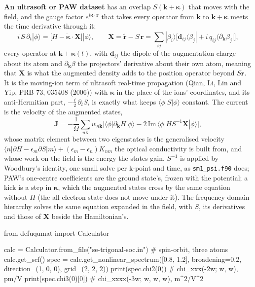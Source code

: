 \documentclass[11pt,a4paper]{article}
\newcommand{\code}[1]{\texttt{\small #1}}
\begin{document}
\textbf{An ultrasoft or PAW dataset} has an overlap $S(\mathbf k+\boldsymbol\kappa)$
that moves with the field, and the gauge factor $e^{i\boldsymbol\kappa\cdot\mathbf r}$
that takes every operator from $\mathbf k$ to $\mathbf k+\boldsymbol\kappa$ meets
the time derivative through it:
\begin{equation*}
i\,S\,\partial_t|\phi\rangle = \big[H - \dot{\boldsymbol\kappa}\cdot\mathbf X\big]|\phi\rangle,
\qquad
\mathbf X = \tilde{\mathbf r} - S\,\mathbf r
 = \sum_{ij}|\beta_i\rangle\big[\mathbf d_{ij}\langle\beta_j|
   + i\,q_{ij}\langle\partial_{\mathbf k}\beta_j|\big],
\end{equation*}
every operator at $\mathbf k+\boldsymbol\kappa(t)$, with $\mathbf d_{ij}$ the
dipole of the augmentation charge about its atom and $\partial_{\mathbf k}\beta$
the projectors' derivative about their own atom, meaning that $\mathbf X$ is what
the augmented density adds to the position operator beyond $S\mathbf r$. It is
the moving-ion term of ultrasoft real-time propagation (Qian, Li, Lin and Yip,
PRB 73, 035408 (2006)) with $\boldsymbol\kappa$ in the place of the ions'
coordinates, and its anti-Hermitian part, $-\tfrac i2\,\partial_t S$, is exactly
what keeps $\langle\phi|S|\phi\rangle$ constant. The current is the velocity of
the augmented states,
\begin{equation*}
\mathbf J = -\frac1\Omega\sum_{n\mathbf k} w_{n\mathbf k}\Big[
\langle\phi|\partial_{\mathbf k}H|\phi\rangle
- 2\,\mathrm{Im}\,\langle\phi|H S^{-1}\mathbf X|\phi\rangle\Big],
\end{equation*}
whose matrix element between two eigenstates is the generalised velocity
$\langle n|\partial H - \epsilon_m\partial S|m\rangle + (\epsilon_m-\epsilon_n)K_{nm}$
the optical conductivity is built from, and whose work on the field is the
energy the states gain. $S^{-1}$ is applied by Woodbury's identity, one small
solve per k-point and time, as \code{sm1\_psi.f90} does; PAW's one-centre
coefficients are the ground state's, frozen with the potential; a kick is a step
in $\boldsymbol\kappa$, which the augmented states cross by the same equation
without $H$ (the all-electron state does not move under it). The frequency-domain
hierarchy solves the same equation expanded in the field, with $S$, its
derivatives and those of $\mathbf X$ beside the Hamiltonian's.

\begin{pycode}
from defuqumat import Calculator

calc = Calculator.from_file("se-trigonal-soc.in")   # spin-orbit, three atoms
calc.get_scf()
spec = calc.get_nonlinear_spectrum([0.8, 1.2], broadening=0.2,
                                   direction=(1, 0, 0), grid=(2, 2, 2))
print(spec.chi2(0))       # chi_xxx(-2w; w, w), pm/V
print(spec.chi3(0)[0])    # chi_xxxx(-3w; w, w, w), m^2/V^2
\end{pycode}
\end{document}
